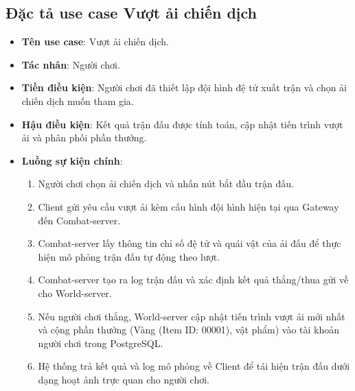 \documentclass[../Project.tex]{subfiles}
\begin{document}
\subsection{Đặc tả use case Vượt ải chiến dịch}
\begin{itemize}
    \item \textbf{Tên use case}: Vượt ải chiến dịch.
    \item \textbf{Tác nhân}: Người chơi.
    \item \textbf{Tiền điều kiện}: Người chơi đã thiết lập đội hình đệ tử xuất trận và chọn ải chiến dịch muốn tham gia.
    \item \textbf{Hậu điều kiện}: Kết quả trận đấu được tính toán, cập nhật tiến trình vượt ải và phân phối phần thưởng.
    \item \textbf{Luồng sự kiện chính}:
    \begin{enumerate}
        \item Người chơi chọn ải chiến dịch và nhấn nút bắt đầu trận đấu.
        \item Client gửi yêu cầu vượt ải kèm cấu hình đội hình hiện tại qua Gateway đến Combat-server.
        \item Combat-server lấy thông tin chỉ số đệ tử và quái vật của ải đấu để thực hiện mô phỏng trận đấu tự động theo lượt.
        \item Combat-server tạo ra log trận đấu và xác định kết quả thắng/thua gửi về cho World-server.
        \item Nếu người chơi thắng, World-server cập nhật tiến trình vượt ải mới nhất và cộng phần thưởng (Vàng (Item ID: 00001), vật phẩm) vào tài khoản người chơi trong PostgreSQL.
        \item Hệ thống trả kết quả và log mô phỏng về Client để tái hiện trận đấu dưới dạng hoạt ảnh trực quan cho người chơi.
    \end{enumerate}
\end{itemize}
\end{document}
